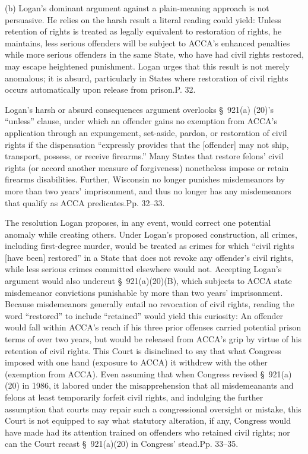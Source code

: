   (b) Logan's dominant argument against a plain-meaning approach is not persuasive. He relies on the harsh result a literal reading could yield: Unless retention of rights is treated as legally equivalent to restoration of rights, he maintains, less serious offenders will be subject to ACCA's enhanced penalties while more serious offenders in the same State, who have had civil rights restored, may escape heightened punishment. Logan urges that this result is not merely anomalous; it is absurd, particularly in States where restoration of civil rights occurs automatically upon release from prison.P. 32.

  Logan's harsh or absurd consequences argument overlooks \S~921(a) (20)'s ``unless'' clause, under which an offender gains no exemption from ACCA's application through an expungement, set-aside, pardon, or restoration of civil rights if the dispensation ``expressly provides that the [offender] may not ship, transport, possess, or receive firearms.'' Many States that restore felons' civil rights (or accord another measure of forgiveness) nonetheless impose or retain firearms disabilities. Further, Wisconsin no longer punishes misdemeanors by more than two years' imprisonment, and thus no longer has any misdemeanors that qualify as ACCA predicates.Pp. 32--33.

  The resolution Logan proposes, in any event, would correct one potential anomaly while creating others. Under Logan's proposed construction, all crimes, including first-degree murder, would be treated as crimes for which ``civil rights [have been] restored'' in a State that does not revoke any offender's civil rights, while less serious crimes committed elsewhere would not. Accepting Logan's argument would also undercut \S~921(a)(20)(B), which subjects to ACCA state misdemeanor convictions punishable by more than two years' imprisonment. Because misdemeanors generally entail no revocation of civil rights, reading the word ``restored'' to include ``retained'' would yield this curiosity: An offender would fall within ACCA's reach if his three prior offenses carried potential prison terms of over two years, but would be released from ACCA's grip by virtue of his retention of civil rights. This Court is disinclined to say that what Congress imposed with one hand (exposure to ACCA) it withdrew with the other (exemption from ACCA). Even assuming that when Congress revised \S~921(a)(20) in 1986, it labored under the misapprehension that all misdemeanants and felons at least temporarily forfeit civil rights, and indulging the further assumption that courts may repair such a congressional oversight or mistake, \newpage  this Court is not equipped to say what statutory alteration, if any, Congress would have made had its attention trained on offenders who retained civil rights; nor can the Court recast \S~921(a)(20) in Congress' stead.Pp. 33--35.

